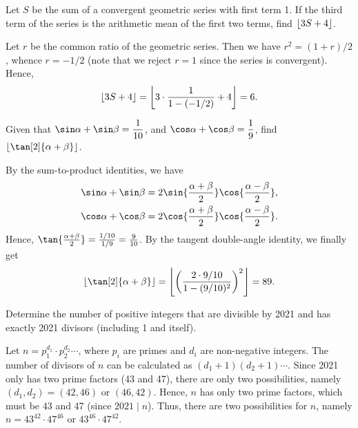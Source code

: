 \begin{question}[6]\label{A::2021-O-1-11}
    Let $S$ be the sum of a convergent geometric series with first term 1. If the third term of the series is the arithmetic mean of the first two terms, find $\left\lfloor 3S + 4 \right\rfloor$.
\end{question}
\begin{solution*}
    Let $r$ be the common ratio of the geometric series. Then we have $r^2 = (1+r)/2$, whence $r = -1/2$ (note that we reject $r = 1$ since the series is convergent). Hence, \[\left\lfloor 3S + 4 \right\rfloor = \left\lfloor 3 \cdot \frac{1}{1 - (-1/2)} + 4 \right\rfloor = 6.\]
\end{solution*}

\begin{question}[89]\label{A::2021-O-1-12}
    Given that $\sin \a + \sin \b = \dfrac1{10}$, and $\cos \a + \cos \b = \dfrac19$, find $\floor{\tan[2]{\a + \b}}$.
\end{question}
\begin{solution*}
    By the sum-to-product identities, we have 
    \begin{align*}
        \sin \a + \sin \b &= 2\sin{\frac{\a+\b}{2}}\cos{\frac{\a - \b}{2}},\\
        \cos \a + \cos \b &= 2\cos{\frac{\a+\b}{2}}\cos{\frac{\a-\b}{2}}.
    \end{align*}
    Hence, $\tan{\frac{\a+\b}{2}} = \frac{1/10}{1/9} = \frac9{10}$. By the tangent double-angle identity, we finally get \[\floor{\tan[2]{\a + \b}} = \floor{\bp{\frac{2 \cdot 9/10}{1 - (9/10)^2}}^2} = 89.\]
\end{solution*}

\begin{question}[2]\label{A::2021-O-1-13}
    Determine the number of positive integers that are divisible by 2021 and has exactly 2021 divisors (including 1 and itself).
\end{question}
\begin{solution*}
    Let $n = p_1^{d_1} \cdot p_2^{d_2} \cdots$, where $p_i$ are primes and $d_i$ are non-negative integers. The number of divisors of $n$ can be calculated as $(d_1 + 1)(d_2 + 1)\cdots$. Since 2021 only has two prime factors (43 and 47), there are only two possibilities, namely $(d_1, d_2) = (42, 46)$ or $(46, 42)$. Hence, $n$ has only two prime factors, which must be 43 and 47 (since $2021 \mid n$). Thus, there are two possibilities for $n$, namely $n = 43^{42} \cdot 47^{46}$ or $43^{46} \cdot 47^{42}$.
\end{solution*}

